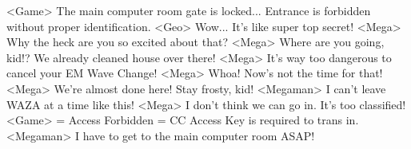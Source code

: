 <Game> The main computer room gate is locked... 
Entrance is forbidden without proper identification. 
<Geo> Wow... It's like super top secret! 
<Mega> Why the heck are you so excited about that? 
<Mega> Where are you going, kid!? We already cleaned house over there! 
<Mega> It's way too dangerous to cancel your EM Wave Change! 
<Mega> Whoa! Now's not the time for that! 
<Mega> We're almost done here! Stay frosty, kid! 
<Megaman> I can't leave WAZA at a time like this! 
<Mega> I don't think we can go in. It's too classified! 
<Game> = Access Forbidden = CC Access Key is required to trans in. 
<Megaman> I have to get to the main computer room ASAP! 

